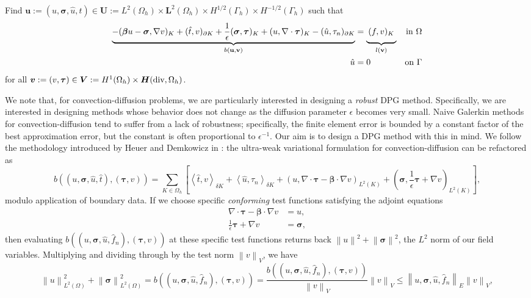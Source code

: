 \documentclass[letterpaper]{article}
\def\btau{\boldsymbol\tau}
\def\bftau{\boldsymbol\tau}
\def\bfsigma{\boldsymbol\sigma}
\def\bbeta{\boldsymbol\beta}
\newcommand{\bs}[1]{\boldsymbol{#1}}
\newcommand{\norm}[1]{\left\| #1 \right\|}
\newcommand{\LRp}[1]{\left( #1 \right)}
\newcommand{\LRs}[1]{\left[ #1 \right]}
\newcommand{\LRa}[1]{\left\langle #1 \right\rangle}
\newcommand{\uh}{\widehat{u}}
\newcommand{\fnh}{\widehat{f}_n}
\renewcommand{\L}{L^2\LRp{\Omega}}
\newcommand{\Oh}{\Omega_h}
\newcommand{\bfH}{\mbox{\boldmath $H$}}
\newcommand{\grad}{\nabla}
\renewcommand{\div}{\grad \cdot}
\begin{document}
Find
$\bs u:=(u,\bfsigma,\hat u,\hat t)
\in\bs U:=L^2(\Omega_h)\times \bs L^2(\Omega_h)\times H^{1/2}(\Gamma_h)\times H^{-1/2}(\Gamma_h)$
such that
\begin{align}
\label{eq:variationalFormulation}
\underbrace{-(\bbeta u-\bfsigma,\nabla v)_K+(\hat t,v)_{\partial K}
+ \frac{1}{\epsilon}(\bfsigma,\btau)_K
+(u,\nabla\cdot\btau)_K
-(\hat u,\tau_n)_{\partial K}}_{b(\mathbf{u}, \mathbf{v})}
&=\underbrace{\:(f,v)_K\genfrac{}{}{0pt}{}{}{}}_{l(\mathbf{v})} &\text{in }\Omega \\
\hat u&=0 &\text{on }\Gamma
\end{align}
for all $\bs v:=(v,\btau)\in
\bs V:=H^1(\Omega_h)\times\bfH(\text{div},\Omega_h)$.


We note that, for convection-diffusion problems, we are particularly
interested in designing a \textit{robust} DPG method.  Specifically, we are
interested in designing methods whose behavior does not change as the
diffusion parameter $\epsilon$ becomes very small.  Naive Galerkin methods for
convection-diffusion tend to suffer from a lack of robustness; specifically,
the finite element error is bounded by a constant factor of the best
approximation error, but the constant is often proportional to
$\epsilon^{-1}$.  Our aim is to design a DPG method with this in mind.  We
follow the methodology introduced by Heuer and Demkowicz in
\cite{DemkowiczHeuer}: the ultra-weak variational formulation for
convection-diffusion can be refactored as
\[
b\LRp{\LRp{u,\bfsigma,\uh,\hat t},\LRp{\bftau,v}} =
\sum_{K\in \Oh}\LRs{\LRa{\hat t,v}_{\delta K}
+\LRa{\uh,\tau_n}_{\delta K} + \LRp{u,\div \bftau
-\bbeta\cdot\grad v}_{L^2(K)}
+\LRp{\bfsigma,\frac{1}{\epsilon} \bftau + \grad v}_{L^2(K)}},
\]
modulo application of boundary data.  If we choose specific
\textit{conforming} test functions satisfying the adjoint equations
\begin{align*}
\div \bftau - \bbeta \cdot \grad v &= u,\\
\frac{1}{\epsilon} \bftau + \grad v &= \bfsigma,
\end{align*}
then evaluating $b\LRp{\LRp{u,\bfsigma,\uh,\fnh},\LRp{\bftau,v}}$ at these
specific test functions returns back $\norm{u}^2 + \norm{\bfsigma}^2$, the $L^2$
norm of our field variables.  Multiplying and dividing through by the test
norm $\norm{v}_V$, we have
\[
\norm{u}_{\L}^2 + \norm{\bfsigma}_{\L}^2 =
b\LRp{\LRp{u,\bfsigma,\uh,\fnh},\LRp{\bftau,v}} =
\frac{b\LRp{\LRp{u,\bfsigma,\uh,\fnh},\LRp{\bftau,v}}}{\norm{v}_V}\norm{v}_V
\leq \norm{u,\bfsigma,\uh,\fnh}_E\norm{v}_V,
\]
\end{document}
